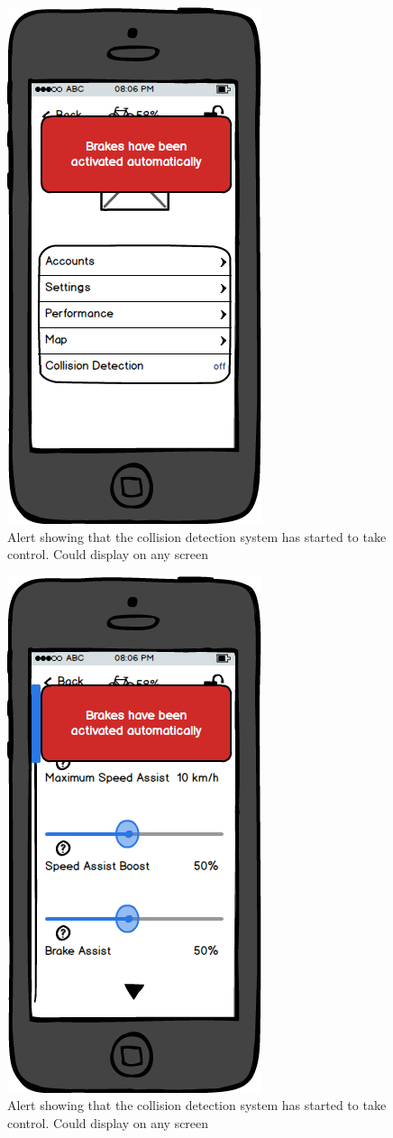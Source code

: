 \documentclass[a4paper]{report}
\begin{document}
\clearpage
\begin{figure}
\centering
\includegraphics[scale=0.8]{figures/prototype_2/main_control_alert}
\caption{Alert showing that the collision detection system has started to take control. Could display on any screen}
\end{figure}
\clearpage
\begin{figure}
\centering
\includegraphics[scale=0.8]{figures/prototype_2/settings_control_alert}
\caption{Alert showing that the collision detection system has started to take control. Could display on any screen}
\end{figure}
\end{document}
